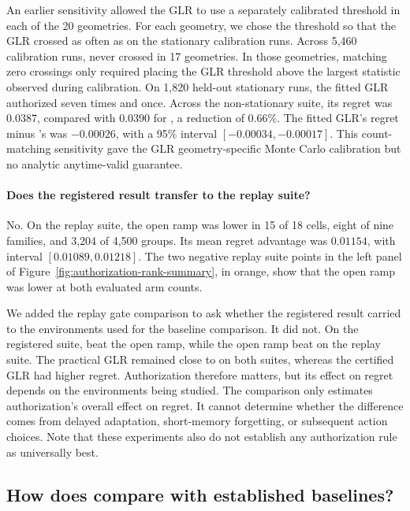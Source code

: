 An earlier sensitivity allowed the GLR to use a separately calibrated
threshold in each of the 20 geometries.
For each geometry, we chose the threshold so that the GLR crossed as often as
\method{} on the stationary calibration runs.
Across 5,460 calibration runs, \method{} never crossed in 17 geometries.
In those geometries, matching zero crossings only required placing the GLR
threshold above the largest statistic observed during calibration.
On 1,820 held-out stationary runs, the fitted GLR authorized seven times and
\method{} once.
Across the non-stationary suite, its regret was $0.0387$, compared with $0.0390$
for \method{}, a reduction of $0.66\%$.
The fitted GLR's regret minus \method{}'s was $-0.00026$, with a 95\% interval
$[-0.00034,-0.00017]$.
This count-matching sensitivity gave the GLR geometry-specific Monte Carlo
calibration but no analytic anytime-valid guarantee.

\paragraph{Does the registered result transfer to the replay suite?}
\label{app:replay-gate}
No. On the replay suite, the open ramp was lower in 15 of 18 cells, eight of
nine families, and 3,204 of 4,500 groups.
Its mean regret advantage was $0.01154$, with interval $[0.01089,0.01218]$.
The two negative replay suite points in the left panel of Figure~\ref{fig:authorization-rank-summary}, in orange, show that the
open ramp was lower at both evaluated arm counts.

We added the replay gate comparison to ask whether the registered result carried
to the environments used for the baseline comparison.
It did not.
On the registered suite, \method{} beat the open ramp, while the open ramp beat
\method{} on the replay suite.
The practical GLR remained close to \method{} on both suites, whereas the
certified GLR had higher regret.
Authorization therefore matters, but its effect on regret depends on the
environments being studied.
The comparison only estimates authorization’s overall effect on regret.
It cannot determine whether the difference comes from delayed adaptation,
short-memory forgetting, or subsequent action choices.
Note that these experiments also do not establish any authorization rule as universally best.

\subsection{How does \method{} compare with established baselines?}
\label{app:historical-environments}
\label{app:literature-replay}

